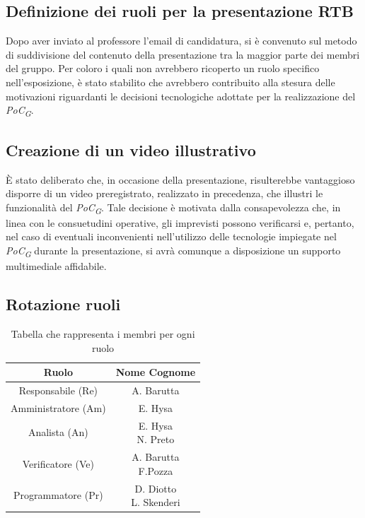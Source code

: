 \documentclass{article}
\begin{document}
\subsection{Definizione dei ruoli per la presentazione RTB}
Dopo aver inviato al professore l'email di candidatura, si è convenuto sul metodo di suddivisione del contenuto della presentazione tra la maggior parte dei membri del gruppo. Per coloro i quali non avrebbero ricoperto un ruolo specifico nell'esposizione, è stato stabilito che avrebbero contribuito alla stesura delle motivazioni riguardanti le decisioni tecnologiche adottate per la realizzazione del \textit{PoC}\textsubscript{\textit{G}}.

\subsection{Creazione di un video illustrativo }
È stato deliberato che, in occasione della presentazione, risulterebbe vantaggioso disporre di un video preregistrato, realizzato in precedenza, che illustri le funzionalità del \textit{PoC}\textsubscript{\textit{G}}. Tale decisione è motivata dalla consapevolezza che, in linea con le consuetudini operative, gli imprevisti possono verificarsi e, pertanto, nel caso di eventuali inconvenienti nell'utilizzo delle tecnologie impiegate nel \textit{PoC}\textsubscript{\textit{G}} durante la presentazione, si avrà comunque a disposizione un supporto multimediale affidabile.

\subsection{Rotazione ruoli}
    \begin{table}[H]
        \centering
        \begin{tabular}{|c|c|} 
            \hline
            \textbf{Ruolo} & \textbf{Nome Cognome} \\
            \hline \hline
            Responsabile (Re) & A. Barutta \\ 
            \hline
            Amministratore (Am) & E. Hysa \\ 
            \hline
            Analista (An) & \makecell{E. Hysa\\N. Preto} \\
            \hline
            Verificatore (Ve) & \makecell{A. Barutta\\F.Pozza} \\
            \hline
            Programmatore (Pr) & \makecell{D. Diotto\\L. Skenderi} \\
            \hline
        \end{tabular}
        \caption{Tabella che rappresenta i membri per ogni ruolo}
    \end{table}
\end{document}
